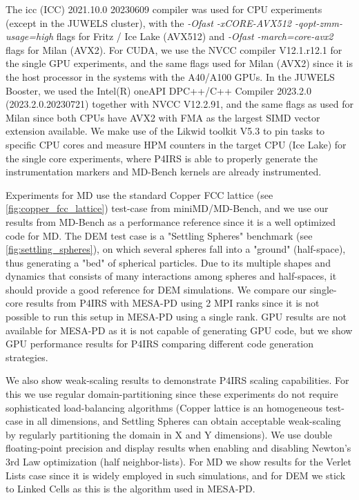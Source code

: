 \documentclass[preprint,12pt]{elsarticle}
\begin{document}
The icc (ICC) 2021.10.0 20230609 compiler was used for CPU experiments (except in the JUWELS cluster), with the \emph{-Ofast -xCORE-AVX512 -qopt-zmm-usage=high} flags for Fritz / Ice Lake (AVX512) and \emph{-Ofast -march=core-avx2} flags for Milan (AVX2).
For CUDA, we use the NVCC compiler V12.1.r12.1 for the single GPU experiments, and the same flags used for Milan (AVX2) since it is the host processor in the systems with the A40/A100 GPUs.
In the JUWELS Booster, we used the Intel(R) oneAPI DPC++/C++ Compiler 2023.2.0 (2023.2.0.20230721) together with NVCC V12.2.91, and the same flags as used for Milan since both CPUs have AVX2 with FMA as the largest SIMD vector extension available.
We make use of the Likwid toolkit V5.3 \cite{likwid} to pin tasks to specific CPU cores and measure HPM counters in the target CPU (Ice Lake) for the single core experiments, where P4IRS is able to properly generate the instrumentation markers and MD-Bench kernels are already instrumented.

Experiments for \ac{MD} use the standard Copper FCC lattice (see \autoref{fig:copper_fcc_lattice}) test-case from miniMD/MD-Bench, and we use our results from MD-Bench as a performance reference since it is a well optimized code for \ac{MD}.
The \ac{DEM} test case is a "Settling Spheres" benchmark (see \autoref{fig:settling_spheres}), on which several spheres fall into a "ground" (half-space), thus generating a "bed" of spherical particles.
Due to its multiple shapes and dynamics that consists of many interactions among spheres and half-spaces, it should provide a good reference for DEM simulations.
We compare our single-core results from P4IRS with MESA-PD using 2 MPI ranks since it is not possible to run this setup in MESA-PD using a single rank.
GPU results are not available for MESA-PD as it is not capable of generating GPU code, but we show GPU performance results for P4IRS comparing different code generation strategies.

We also show weak-scaling results to demonstrate P4IRS scaling capabilities.
For this we use regular domain-partitioning since these experiments do not require sophisticated load-balancing algorithms (Copper lattice is an homogeneous test-case in all dimensions, and Settling Spheres can obtain acceptable weak-scaling by regularly partitioning the domain in X and Y dimensions).
We use double floating-point precision and display results when enabling and disabling Newton's 3rd Law optimization (half neighbor-lists).
For \ac{MD} we show results for the Verlet Lists case since it is widely employed in such simulations, and for \ac{DEM} we stick to Linked Cells as this is the algorithm used in MESA-PD.
\end{document}

